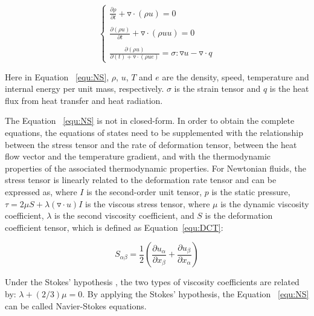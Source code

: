 \begin{equation}
    \left\{\begin{matrix}
\frac{\partial \rho}{\partial t} + \triangledown \cdot (\rho u) = 0\\ 
\\
\frac{\partial (\rho u)}{\partial t} + \triangledown \cdot (\rho u u) = 0\\ 
\\
\frac{\partial (\rho u)}{\partial (t) + \triangledown \cdot (\rho u e)} = \sigma : \triangledown u - \triangledown \cdot q
\end{matrix}\right.
\label{equ:NS}
\end{equation}

Here in Equation ~\ref{equ:NS}, $\rho$, $u$, $T$ and $e$ are the density, speed, temperature and internal energy per unit mass, respectively. $\sigma$ is the strain tensor and $q$ is the heat flux from heat transfer and heat radiation.

The Equation ~\ref{equ:NS} is not in closed-form. In order to obtain the complete equations, the equations of states need to be supplemented with the relationship between the stress tensor and the rate of deformation tensor, between the heat flow vector and the temperature gradient, and with the thermodynamic properties of the associated thermodynamic properties. For Newtonian fluids, the stress tensor is linearly related to the deformation rate tensor and can be expressed as, where $I$ is the second-order unit tensor, $p$ is the static pressure, $\tau = 2 \mu S + \lambda(\triangledown \cdot u)I$ is the viscous stress tensor, where $\mu$ is the dynamic viscosity coefficient, $\lambda$ is the second viscosity coefficient, and $S$ is the deformation coefficient tensor, which is defined as Equation~\ref{equ:DCT}:

\begin{equation}
    \label{equ:DCT}
        S_{\alpha \beta} = \frac{1}{2} (\frac{\partial u_\alpha}{\partial x_\beta} + \frac{\partial u_\beta}{\partial x_\alpha})
\end{equation}

Under the Stokes' hypothesis \cite{gad1995stokes}, the two types of viscosity coefficients are related by: $\lambda + (2/3)\mu = 0$. By applying the Stokes' hypothesis, the Equation ~\ref{equ:NS} can be called Navier-Stokes equations.



